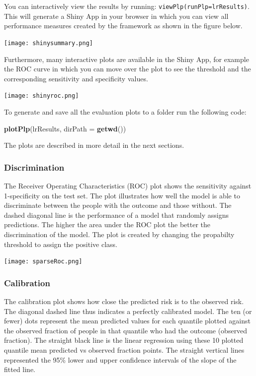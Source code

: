 \documentclass[]{article}
\newenvironment{Shaded}{\begin{snugshade}}{\end{snugshade}}
\newcommand{\KeywordTok}[1]{\textcolor[rgb]{0.13,0.29,0.53}{\textbf{#1}}}
\newcommand{\DataTypeTok}[1]{\textcolor[rgb]{0.13,0.29,0.53}{#1}}
\newcommand{\NormalTok}[1]{#1}
\begin{document}
You can interactively view the results by running:
\texttt{viewPlp(runPlp=lrResults)}. This will generate a Shiny App in
your browser in which you can view all performance measures created by
the framework as shown in the figure below.

\texttt{[image: shinysummary.png]}

Furthermore, many interactive plots are available in the Shiny App, for
example the ROC curve in which you can move over the plot to see the
threshold and the corresponding sensitivity and specificity values.

\texttt{[image: shinyroc.png]}

To generate and save all the evaluation plots to a folder run the
following code:

\begin{Shaded}
\begin{Highlighting}[]
\KeywordTok{plotPlp}\NormalTok{(lrResults, }\DataTypeTok{dirPath =} \KeywordTok{getwd}\NormalTok{())}
\end{Highlighting}
\end{Shaded}

The plots are described in more detail in the next sections.

\newpage

\subsubsection{Discrimination}\label{discrimination}

The Receiver Operating Characteristics (ROC) plot shows the sensitivity
against 1-specificity on the test set. The plot illustrates how well the
model is able to discriminate between the people with the outcome and
those without. The dashed diagonal line is the performance of a model
that randomly assigns predictions. The higher the area under the ROC
plot the better the discrimination of the model. The plot is created by
changing the propabilty threshold to assign the positive class.

\texttt{[image: sparseRoc.png]}

\newpage

\subsubsection{Calibration}\label{calibration}

The calibration plot shows how close the predicted risk is to the
observed risk. The diagonal dashed line thus indicates a perfectly
calibrated model. The ten (or fewer) dots represent the mean predicted
values for each quantile plotted against the observed fraction of people
in that quantile who had the outcome (observed fraction). The straight
black line is the linear regression using these 10 plotted quantile mean
predicted vs observed fraction points. The straight vertical lines
represented the 95\% lower and upper confidence intervals of the slope
of the fitted line.
\end{document}
